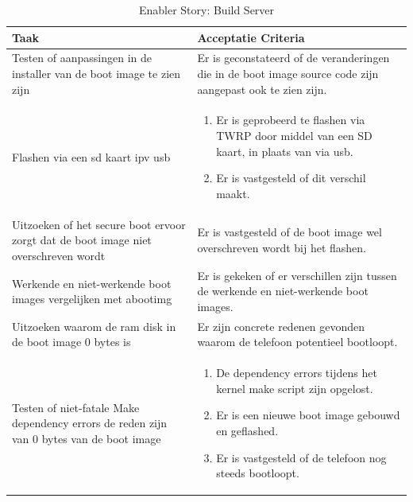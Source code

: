 \documentclass[a4paper]{report}
\begin{document}
\begin{tcolorbox}
  \begin{table}[H]
      \centering
    \begin{tabularx}{1\textwidth}{|X|X|}
      \hline
      \cellcolor[HTML]{ffcc99} \textbf{Taak} & \cellcolor[HTML]{ffcc99} \textbf{Acceptatie Criteria} \\ 
      \hline
      Testen of aanpassingen in de installer van de boot image te zien zijn & Er is geconstateerd of de veranderingen die in de boot image source code zijn aangepast ook te zien zijn. \\ 
      \hline 
      Flashen via een sd kaart ipv usb &
      \begin{enumerate}[leftmargin=.4cm, topsep=0cm, itemsep=.2cm]
        \item Er is geprobeerd te flashen via TWRP door middel van een SD kaart, in plaats van via usb.
        \item Er is vastgesteld of dit verschil maakt.
      \end{enumerate} \\
      \hline
      Uitzoeken of het secure boot ervoor zorgt dat de boot image niet overschreven wordt & Er is vastgesteld of de boot image wel overschreven wordt bij het flashen. \\ 
      \hline 
      Werkende en niet-werkende boot images vergelijken met abootimg & Er is gekeken of er verschillen zijn tussen de werkende en niet-werkende boot images. \\
      \hline 
      Uitzoeken waarom de ram disk in de boot image 0 bytes is & Er zijn concrete redenen gevonden waarom de telefoon potentieel bootloopt. \\ 
      \hline
      Testen of niet-fatale Make dependency errors de reden zijn van 0 bytes van de boot image & 
      \begin{enumerate}[leftmargin=.4cm, topsep=0cm, itemsep=.2cm]
        \item De dependency errors tijdens het kernel make script zijn opgelost.
        \item Er is een nieuwe boot image gebouwd en geflashed.
        \item Er is vastgesteld of de telefoon nog steeds bootloopt.
      \end{enumerate} \\
      \hline
    \end{tabularx}
    \caption{Enabler Story: Build Server}
  \label{table:it3:story_buildserver}
  \end{table}
  \end{tcolorbox}
\end{document}
